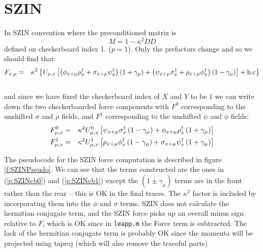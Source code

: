 \documentclass[12pt]{article}
\begin{document}
\section{SZIN}
In SZIN convention where the preconditioned matrix is
\begin{equation}
M = 1 - \kappa^2 D D
\end{equation}
defined on checkerboard index 1. ($p=1$).
Only the prefactors change and so we should find that:
\begin{eqnarray}
F_{x,\mu} &=& \kappa^2 \left\{ U_{\mu,x} \left[ \left( \phi_{x+\mu} \rho^{\dagger}_{x} + \sigma_{x+\mu} \psi^{\dagger}_{x} \right)  (1 + \gamma_{\mu}) +  \left( \psi_{x+\mu} \sigma^{\dagger}_x + \rho_{x+\mu} \phi^{\dagger}_x \right) (1 - \gamma_{\mu}) \right] + \mbox{h.c} \right\} \nonumber \\
& & \label{e:SZINForceTerm}
\end{eqnarray}
and since we have fixed the checkerboard index of $X$ and $Y$ to be $1$ we can
write down the two checkerboarded force components with $F^{0}$ corresponding 
to the unshifted $\sigma$ and $\rho$ fields, and $F^{1}$ corresponding to the 
unshifted $\psi$ and $\phi$ fields:
\begin{eqnarray}
F^{0}_{\mu,x} &=& \kappa^2 U^{0}_{\mu,x} \left[ \psi_{x + \mu} \sigma^{\dagger}_{x} \left( 1 - \gamma_{\mu} \right) + \phi_{x+\mu} \rho^{\dagger}_{x} \left( 1 + \gamma_{\mu} \right) \right] \label{e:SZINcb0} \\
F^{1}_{\mu,x} &=& \kappa^2 U^{1}_{\mu,x} \left[  \rho_{x+\mu} \phi^{\dagger}_{x} \left( 1 - \gamma_{\mu} \right) + \sigma_{x+\mu} \psi^{\dagger}_{x} \left( 1 + \gamma_{\mu} \right) \right] \label{e:SZINcb1} 
\end{eqnarray}

The pseudocode for the SZIN force computation is described in figure
\ref{f:SZINPseudo}. We can see that the terms constructed are the ones
in (\ref{e:SZINcb0}) and (\ref{e:SZINcb1}) except the $(1 \pm
\gamma_{\mu})$ terms are in the front rather than the rear -- this is
OK in the final traces. The $\kappa^2$ factor is included by
incorporating them into the $\phi$ and $\sigma$ terms. SZIN does not
calculate the hermitian conjugate term, and the SZIN force picks up an
overall minus sign relative to $F$, which is OK since in {\tt leapp.m}
the Force term is subtracted. The lack of the hermitian conjugate term
is probably OK since the momenta will be projected using taproj (which
will also remove the traceful parts)
\end{document}
